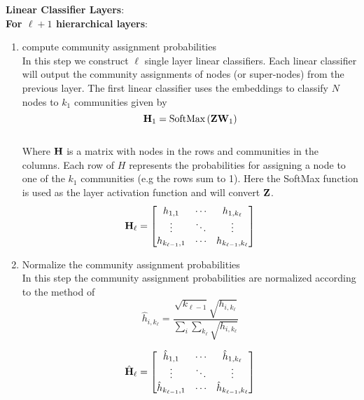 \documentclass[a4paper,12pt]{article}
\newcommand{\forceindent}{\leavevmode{\parindent=2em\indent}}
\begin{document}
\begin{itemize}
\begin{enumerate}
{\begin{enumerate}
			\end{enumerate}
			\forceindent \textbf{Linear Classifier Layers}: \\
			\forceindent \textbf{For $\ell+1$ hierarchical layers}:
			\begin{enumerate}
				\item[]{compute community assignment probabilities 
					\\
					In this step we construct $\ell$ single layer linear classifiers. Each linear classifier will output the community assignments of nodes (or super-nodes) from the previous layer. The first linear classifier uses the embeddings to classify $N$ nodes to $k_1$ communities given by
					\[{\bf H}_{1} = \text{SoftMax}\left({\bf Z}{\bf W}_{1}\right) \]
					\\ 
					Where $\bf H$ is a matrix with nodes in the rows and communities in the columns. Each row of $H$ represents the probabilities for assigning a node to one of the $k_1$ communities (e.g the rows sum to 1). Here the SoftMax function is used as the layer activation function and will convert ${\bf Z}$. 
					\[{\bf H}_\ell = \begin{bmatrix}
						h_{1, 1} & \cdots & h_{1, k_\ell} \\
						\vdots  & \ddots & \vdots \\
						h_{k_{\ell - 1}, 1} & \cdots & h_{k_{\ell -1}, k_\ell} 
					\end{bmatrix}\]}
				
				\item[]{Normalize the community assignment probabilities
					\\
					In this step the community assignment probabilities are normalized according to the method of %
					\[ \hat{h}_{i,k_\ell} = \frac{\sqrt{k_{\ell-1}} \sqrt{h_{i, k_\ell}}}{\sum_i \sum_{k_\ell} \sqrt{h_{i, k_\ell}}}\]
					
					\[\hat{\bf H}_\ell = \begin{bmatrix}
						\hat{h}_{1, 1} & \cdots & \hat{h}_{1, k_\ell} \\
						\vdots  & \ddots & \vdots \\
						\hat{h}_{k_{\ell - 1}, 1} & \cdots & \hat{h}_{k_{\ell -1}, k_\ell} 
					\end{bmatrix}\]
				}
				

\end{enumerate}}
\end{enumerate}
\end{itemize}
\end{document}
